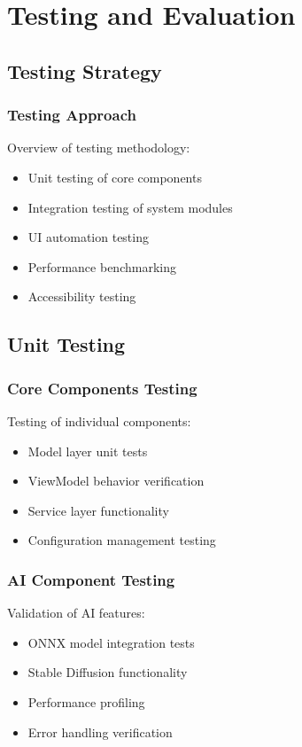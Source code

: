\chapter{Testing and Evaluation}

\section{Testing Strategy}
\subsection{Testing Approach}
Overview of testing methodology:
\begin{itemize}
    \item Unit testing of core components
    \item Integration testing of system modules
    \item UI automation testing
    \item Performance benchmarking
    \item Accessibility testing
\end{itemize}

\section{Unit Testing}
\subsection{Core Components Testing}
Testing of individual components:
\begin{itemize}
    \item Model layer unit tests
    \item ViewModel behavior verification
    \item Service layer functionality
    \item Configuration management testing
\end{itemize}

\subsection{AI Component Testing}
Validation of AI features:
\begin{itemize}
    \item ONNX model integration tests
    \item Stable Diffusion functionality
    \item Performance profiling
    \item Error handling verification
\end{itemize}

